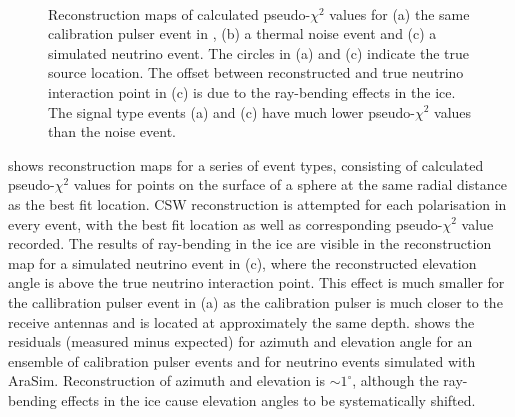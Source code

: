 \begin{figure}[htpb]
  \hfill
  \\
  \caption{Reconstruction maps of calculated pseudo-$\chi^{2}$ values for (a) the same calibration pulser event in , (b) a thermal noise event and (c) a simulated neutrino event. The circles in (a) and (c) indicate the true source location. The offset between reconstructed and true neutrino interaction point in (c) is due to the ray-bending effects in the ice. The signal type events (a) and (c) have much lower pseudo-$\chi^{2}$ values than the noise event.}
  \label{fig:analysis:Reconstruction:CSW-ChiSq-Example}
\end{figure}

 shows reconstruction maps for a series of event types, consisting of calculated pseudo-$\chi^{2}$ values for points on the surface of a sphere at the same radial distance as the best fit location. CSW reconstruction is attempted for each polarisation in every event, with the best fit location as well as corresponding pseudo-$\chi^{2}$ value recorded. The results of ray-bending in the ice are visible in the reconstruction map for a simulated neutrino event in (c), where the reconstructed elevation angle is above the true neutrino interaction point. This effect is much smaller for the callibration pulser event in (a) as the calibration pulser is much closer to the receive antennas and is located at approximately the same depth.  shows the residuals (measured minus expected) for azimuth and elevation angle for an ensemble of calibration pulser events and for neutrino events simulated with AraSim. Reconstruction of azimuth and elevation is $\sim 1^{\circ}$, although the ray-bending effects in the ice cause elevation angles to be systematically shifted. 



